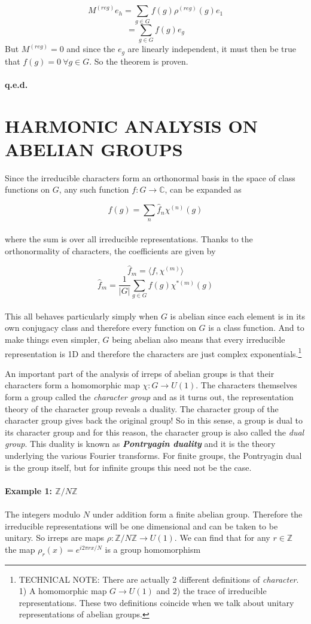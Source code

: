 \documentclass[9 pt]{report}
\begin{document}
$$ M^{(reg)}e_h = \sum_{g\in G}f(g)\rho^{(reg)}(g) e_1 $$
$$  = \sum_{g\in G}f(g)e_{g} $$
But $M^{(reg)}=0$ and since the $e_{g}$ are linearly independent, it must then be true that $f(g)=0 \:\forall g\in G$. So the theorem is proven.
\\
\\
\textbf{q.e.d.}


\pagebreak


{\centering
\section*{HARMONIC ANALYSIS ON ABELIAN GROUPS}}
Since the irreducible characters form an orthonormal basis in the space of class functions on $G$, any such function $f:G\to\mathbb{C}$, can be expanded as

$$ f(g) = \sum_n \hat{f}_n \chi^{(n)}(g) $$
\\
where the sum is over all irreducible representations. Thanks to the orthonormality of characters, the coefficients are given by

$$ \hat{f}_m = \langle f, \chi^{(m)} \rangle $$
$$ \hat{f}_m = \frac{1}{|G|}\sum_{g\in G} f(g)\chi^{*(m)}(g) $$
\\
This all behaves particularly simply when $G$ is abelian since each element is in its own conjugacy class and therefore every function on $G$ is a class function. And to make things even simpler, $G$ being abelian also means that every irreducible representation is 1D and therefore the characters are just complex exponentials.\footnote{TECHNICAL NOTE: There are actually 2 different definitions of \emph{character}. 1) A homomorphic map $G\to U(1)$ and 2) the trace of irreducible representations. These two definitions coincide when we talk about unitary representations of abelian groups.} 

An important part of the analysis of irreps of abelian groups is that their characters form a homomorphic map $\chi:G\to U(1)$. The characters themselves form a group called the \textit{character group} and as it turns out, the representation theory of the character group reveals a duality. The character group of the character group gives back the original group! So in this sense, a group is dual to its character group and for this reason, the character group is also called the \textit{dual group}. This duality is known as \textbf{\emph{Pontryagin duality}} and it is the theory underlying the various Fourier transforms. For finite groups, the Pontryagin dual is the group itself, but for infinite groups this need not be the case. 
\\
\\
\textbf{Example 1: $\mathbb{Z}/N\mathbb{Z}$}
\\
\\
The integers modulo $N$ under addition form a finite abelian group. Therefore the irreducible representations will be one dimensional and can be taken to be unitary. So irreps are maps $\rho:\mathbb{Z}/N\mathbb{Z}\to U(1)$. We can find that for any $r \in \mathbb{Z} $ the map  $\rho_r(x) = e^{i2\pi r x / N}$ is a group homomorphism
\end{document}
